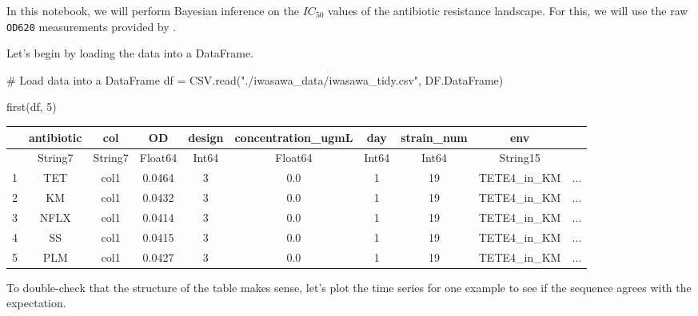 \documentclass[
]{scrartcl}
\newenvironment{Shaded}{\begin{snugshade}}{\end{snugshade}}
\newcommand{\CommentTok}[1]{\textcolor[rgb]{0.37,0.37,0.37}{#1}}
\newcommand{\FloatTok}[1]{\textcolor[rgb]{0.68,0.00,0.00}{#1}}
\newcommand{\FunctionTok}[1]{\textcolor[rgb]{0.28,0.35,0.67}{#1}}
\newcommand{\NormalTok}[1]{\textcolor[rgb]{0.00,0.23,0.31}{#1}}
\newcommand{\OperatorTok}[1]{\textcolor[rgb]{0.37,0.37,0.37}{#1}}
\newcommand{\StringTok}[1]{\textcolor[rgb]{0.13,0.47,0.30}{#1}}
\begin{document}
In this notebook, we will perform Bayesian inference on the \(IC_{50}\)
values of the antibiotic resistance landscape. For this, we will use the
raw \texttt{OD620} measurements provided by \textcite{iwasawa2022}.

Let's begin by loading the data into a DataFrame.

\begin{Shaded}
\begin{Highlighting}[]
\CommentTok{\# Load data into a DataFrame}
\NormalTok{df }\OperatorTok{=}\NormalTok{ CSV.}\FunctionTok{read}\NormalTok{(}\StringTok{"./iwasawa\_data/iwasawa\_tidy.csv"}\NormalTok{, DF.DataFrame)}

\FunctionTok{first}\NormalTok{(df, }\FloatTok{5}\NormalTok{)}
\end{Highlighting}
\end{Shaded}

\begin{tabular}{r|ccccccccc}
    & antibiotic & col & OD & design & concentration\_ugmL & day & strain\_num & env & \\
    \hline
    & String7 & String7 & Float64 & Int64 & Float64 & Int64 & Int64 & String15 & \\
    \hline
    1 & TET & col1 & 0.0464 & 3 & 0.0 & 1 & 19 & TETE4\_in\_KM & $\dots$ \\
    2 & KM & col1 & 0.0432 & 3 & 0.0 & 1 & 19 & TETE4\_in\_KM & $\dots$ \\
    3 & NFLX & col1 & 0.0414 & 3 & 0.0 & 1 & 19 & TETE4\_in\_KM & $\dots$ \\
    4 & SS & col1 & 0.0415 & 3 & 0.0 & 1 & 19 & TETE4\_in\_KM & $\dots$ \\
    5 & PLM & col1 & 0.0427 & 3 & 0.0 & 1 & 19 & TETE4\_in\_KM & $\dots$ \\
\end{tabular}

To double-check that the structure of the table makes sense, let's plot
the time series for one example to see if the sequence agrees with the
expectation.
\end{document}
